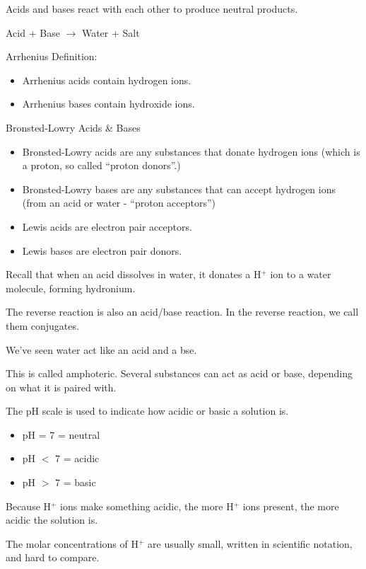 \documentclass[../hchem.tex]{subfiles}
\begin{document}
Acids and bases react with each other to produce neutral products.

Acid + Base $\rightarrow$ Water + Salt 

Arrhenius Definition:
\begin{itemize}
    \item Arrhenius acids contain hydrogen ions.
    \item Arrhenius bases contain hydroxide ions.
\end{itemize}

Bronsted-Lowry Acids \& Bases 
\begin{itemize}
    \item Bronsted-Lowry acids are any substances that donate hydrogen ions (which is a proton, so called ``proton donors''.)
    \item Bronsted-Lowry bases are any substances that can accept hydrogen ions (from an acid or water - ``proton acceptors'')
\end{itemize}

\begin{itemize}
    \item Lewis acids are electron pair acceptors.
    \item Lewis bases are electron pair donors.
\end{itemize}

Recall that when an acid dissolves in water, it donates a H$^+$ ion to a water molecule, forming hydronium.

The reverse reaction is also an acid/base reaction. In the reverse reaction, we call them conjugates.

We've seen water act like an acid and a bse.

This is called amphoteric. Several substances can act as acid or base, depending on what it is paired with.

The pH scale is used to indicate how acidic or basic a solution is.
\begin{itemize}
    \item pH = 7 = neutral 
    \item pH $<$ 7 = acidic 
    \item pH $>$ 7 = basic 
\end{itemize}

Because H$^+$ ions make something acidic, the more H$^+$ ions present, the more acidic the solution is.

The molar concentrations of H$^+$ are usually small, written in scientific notation, and hard to compare.
\end{document}
